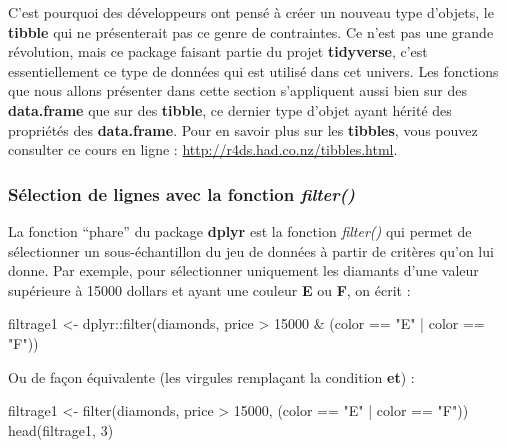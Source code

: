 \documentclass[
]{book}
\newenvironment{Shaded}{\begin{snugshade}}{\end{snugshade}}
\newcommand{\DecValTok}[1]{\textcolor[rgb]{0.00,0.00,0.81}{#1}}
\newcommand{\FunctionTok}[1]{\textcolor[rgb]{0.00,0.00,0.00}{#1}}
\newcommand{\NormalTok}[1]{#1}
\newcommand{\OtherTok}[1]{\textcolor[rgb]{0.56,0.35,0.01}{#1}}
\newcommand{\SpecialCharTok}[1]{\textcolor[rgb]{0.00,0.00,0.00}{#1}}
\newcommand{\StringTok}[1]{\textcolor[rgb]{0.31,0.60,0.02}{#1}}
\theoremstyle{definition}
\theoremstyle{definition}
\theoremstyle{definition}
\theoremstyle{definition}
\theoremstyle{remark}
\begin{document}
C'est pourquoi des développeurs ont pensé à créer un nouveau type d'objets, le \textbf{tibble} qui ne présenterait pas ce genre de contraintes. Ce n'est pas une grande révolution, mais ce package faisant partie du projet \textbf{tidyverse}, c'est essentiellement ce type de données qui est utilisé dans cet univers. Les fonctions que nous allons présenter dans cette section s'appliquent aussi bien sur des \textbf{data.frame} que sur des \textbf{tibble}, ce dernier type d'objet ayant hérité des propriétés des \textbf{data.frame}. Pour en savoir plus sur les \textbf{tibbles}, vous pouvez consulter ce cours en ligne : \url{http://r4ds.had.co.nz/tibbles.html}.

\hypertarget{suxe9lection-de-lignes-avec-la-fonction-filter}{%
\subsubsection{\texorpdfstring{Sélection de lignes avec la fonction \emph{filter()}}{Sélection de lignes avec la fonction filter()}}\label{suxe9lection-de-lignes-avec-la-fonction-filter}}

La fonction ``phare'' du package \textbf{dplyr} est la fonction \emph{filter()} qui permet de sélectionner un sous-échantillon du jeu de données à partir de critères qu'on lui donne. Par exemple, pour sélectionner uniquement les diamants d'une valeur supérieure à 15000 dollars et ayant une couleur \textbf{E} ou \textbf{F}, on écrit :

\begin{Shaded}
\begin{Highlighting}[]
\NormalTok{filtrage1 }\OtherTok{\textless{}{-}}\NormalTok{ dplyr}\SpecialCharTok{::}\FunctionTok{filter}\NormalTok{(diamonds, price }\SpecialCharTok{\textgreater{}} \DecValTok{15000} \SpecialCharTok{\&}\NormalTok{ (color }\SpecialCharTok{==} \StringTok{"E"} \SpecialCharTok{|}\NormalTok{ color }\SpecialCharTok{==} \StringTok{"F"}\NormalTok{))}
\end{Highlighting}
\end{Shaded}

Ou de façon équivalente (les virgules remplaçant la condition \textbf{et}) :

\begin{Shaded}
\begin{Highlighting}[]
\NormalTok{filtrage1 }\OtherTok{\textless{}{-}} \FunctionTok{filter}\NormalTok{(diamonds, price }\SpecialCharTok{\textgreater{}} \DecValTok{15000}\NormalTok{, (color }\SpecialCharTok{==} \StringTok{"E"} \SpecialCharTok{|}\NormalTok{ color }\SpecialCharTok{==} \StringTok{"F"}\NormalTok{))}
\FunctionTok{head}\NormalTok{(filtrage1, }\DecValTok{3}\NormalTok{)}
\end{Highlighting}
\end{Shaded}
\end{document}
